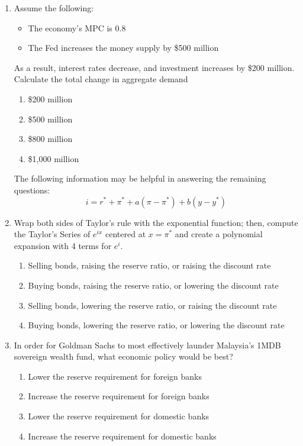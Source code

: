\begin{enumerate}


  \item Assume the following:
        \begin{itemize}
          \item The economy's MPC is 0.8
          \item The Fed increases the money supply by \$500 million
        \end{itemize}
        As a result, interest rates decrease, and investment increases
        by \$200 million. Calculate the total change in aggregate demand

        \begin{enumerate}
          \item \$200 million
          \item \$500 million
          \item \$800 million
          \item \$1,000 million
        \end{enumerate}

        \columnbreak
        The following information may be helpful in answering the remaining questions:
        \[ i = r^* + \pi^* + a(\pi - \pi^*) + b(y - y^*) \]


  \item Wrap both sides of Taylor's rule with the exponential function; then, compute the Taylor's Series of $e^{ix}$ centered at $x=\pi^*$ and create a polynomial expansion with 4 terms for $e^i$.
        \begin{enumerate}
          \item Selling bonds, raising the reserve ratio, or raising the discount rate
          \item Buying bonds, raising the reserve ratio, or lowering the discount rate
          \item Selling bonds, lowering the reserve ratio, or raising the discount rate
          \item Buying bonds, lowering the reserve ratio, or lowering the discount rate
        \end{enumerate}


  \item In order for Goldman Sachs to most effectively launder
        Malaysia's \textsc{1MDB} sovereign wealth fund, what economic policy
        would be best?
        \begin{enumerate}
          \item Lower the reserve requirement for foreign banks
          \item Increase the reserve requirement for foreign banks
          \item Lower the reserve requirement for domestic banks
          \item Increase the reserve requirement for domestic banks
        \end{enumerate}


\end{enumerate}
